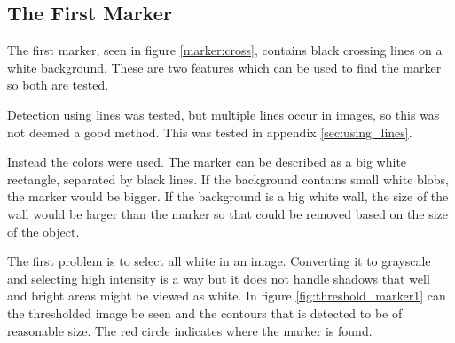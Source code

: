 \subsection{The First Marker}\label{sec:full_marker1}
The first marker, seen in figure \ref{marker:cross}, contains black crossing lines on a white background.
These are two features which can be used to find the marker so both are tested.

Detection using lines was tested, but multiple lines occur in images, so this was not deemed a good method.
This was tested in appendix \ref{sec:using_lines}.

Instead the colors were used.
The marker can be described as a big white rectangle, separated by black lines.
If the background contains small white blobs, the marker would be bigger.
If the background is a big white wall, the size of the wall would be larger than the marker so that could be removed based on the size of the object.

The first problem is to select all white in an image.
Converting it to grayscale and selecting high intensity is a way but it does not handle shadows that well and bright areas might be viewed as white.
In figure \ref{fig:threshold_marker1} can the thresholded image be seen and the contours that is detected to be of reasonable size.
The red circle indicates where the marker is found.

